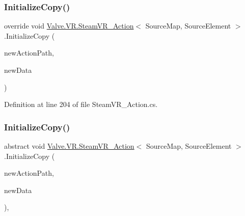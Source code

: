 \subsubsection{\texorpdfstring{InitializeCopy()}{InitializeCopy()}\hspace{0.1cm}{\footnotesize\ttfamily [1/2]}}
{\footnotesize\ttfamily override void \mbox{\hyperlink{class_valve_1_1_v_r_1_1_steam_v_r___action}{Valve.\+V\+R.\+Steam\+V\+R\+\_\+\+Action}}$<$ Source\+Map, Source\+Element $>$.Initialize\+Copy (\begin{DoxyParamCaption}\item[{string}]{new\+Action\+Path,  }\item[{\mbox{\hyperlink{class_valve_1_1_v_r_1_1_steam_v_r___action___source___map}{Steam\+V\+R\+\_\+\+Action\+\_\+\+Source\+\_\+\+Map}}}]{new\+Data }\end{DoxyParamCaption})\hspace{0.3cm}{\ttfamily [protected]}}



Definition at line 204 of file Steam\+V\+R\+\_\+\+Action.\+cs.

\mbox{\label{class_valve_1_1_v_r_1_1_steam_v_r___action_aee6486f13a4e850779f50c95725b30d0}} 
\subsubsection{\texorpdfstring{InitializeCopy()}{InitializeCopy()}\hspace{0.1cm}{\footnotesize\ttfamily [2/2]}}
{\footnotesize\ttfamily abstract void \mbox{\hyperlink{class_valve_1_1_v_r_1_1_steam_v_r___action}{Valve.\+V\+R.\+Steam\+V\+R\+\_\+\+Action}}$<$ Source\+Map, Source\+Element $>$.Initialize\+Copy (\begin{DoxyParamCaption}\item[{string}]{new\+Action\+Path,  }\item[{\mbox{\hyperlink{class_valve_1_1_v_r_1_1_steam_v_r___action___source___map}{Steam\+V\+R\+\_\+\+Action\+\_\+\+Source\+\_\+\+Map}}}]{new\+Data }\end{DoxyParamCaption})\hspace{0.3cm}{\ttfamily [protected]}, {}}

